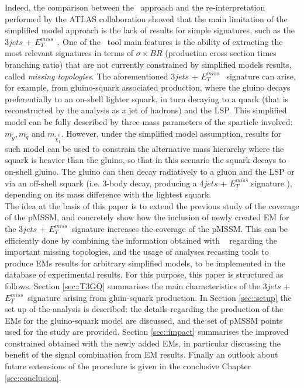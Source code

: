 \documentclass[epj,nopacs,fleqn]{svjour}
\newcommand{\MET}{{ $E_T ^{miss}$}}
\begin{document}
Indeed, the comparison between the \SMO~approach and the re-interpretation performed by the ATLAS collaboration showed  that the main limitation of the simplified model approach is the lack of results for simple signatures, such as the $3jets$ +\MET~. One of the \SMO~tool main features is the ability of extracting the most relevant signatures in terms of $\sigma \times BR$ (production cross section  times branching ratio) that are not currently constrained by simplified models results, called \textit{missing topologies}. The aforementioned $3jets$ +\MET~ signature can arise, for example, from gluino-squark associated production, where the gluino decays preferentially to an on-shell lighter squark, in turn decaying to a quark (that is reconstructed by the analysis as a jet of hadrons) and the LSP. This simplified model can be fully described by three mass parameters of the sparticle involved: $m_{\tilde g}, m_{\tilde q}$ and $m_{\tilde \chi _1 ^0}$. However, under the simplified model assumption, results for such model can be used to constrain the alternative mass hierarchy where the squark is heavier than the gluino, so that in this scenario the squark decays to on-shell gluino. The gluino can then decay radiatively to a gluon and the LSP or via an off-shell squark (i.e. 3-body decay, producing a $4jets$ + $E_T ^{miss}$ signature ), depending on its mass difference with the lightest squark. 
\\

The idea at the basis of this paper is to extend the previous study of the coverage of the pMSSM, and concretely show how the inclusion of newly created EM for the $3jets$ + \MET~signature increases the coverage of the pMSSM. This can be efficiently done by combining the information obtained with \SMO~ regarding the important missing topologies, and the usage of analyses recasting tools to produce EMs results for arbitrary simplified models, to be implemented in the database of experimental results. For this purpose, this paper is structured as follows. Section \ref{sec::T3GQ} summarises the main characteristics of the $3jets$ + \MET~signature arising from gluin-squark production. In Section \ref{sec::setup} the set up of the \SMO analysis is described: the details regarding the production of the EMs for the gluino-squark model are discussed, and the set of pMSSM points used for the study are provided. Section \ref{sec::impact} summarises the improved constrained obtained with the newly added EMs, in particular discussing the benefit of the signal combination from EM results. Finally an outlook about future extensions of the procedure is given in the conclusive Chapter \ref{sec:conclusion}.  
\end{document}
